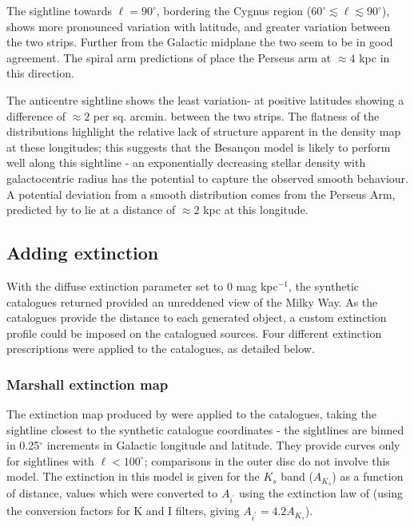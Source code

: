 \documentclass[a4paper,useAMS,usenatbib]{mn2e}
\begin{document}
The sightline towards $\ell=90^{\circ}$, bordering the Cygnus region ($60^{\circ}\lesssim\ell\lesssim 90^{\circ}$), shows more pronounced variation with latitude, and greater variation between the two strips. Further from the Galactic midplane the two seem to be in good agreement. The spiral arm predictions of \citet{Vallee2008} place the Perseus arm at $\approx4$ kpc in this direction.

The anticentre sightline shows the least variation- at positive latitudes showing a difference of $\approx 2$ per sq. arcmin. between the two strips. The flatness of the distributions highlight the relative lack of structure apparent in the density map at these longitudes; this suggests that the Besan\c{c}on model is likely to perform well along this sightline - an exponentially decreasing stellar density with galactocentric radius has the potential to capture the observed smooth behaviour. A potential deviation from a smooth distribution comes from the Perseus Arm, predicted by \citet{Vallee2008} to lie at a distance of $\approx2$ kpc at this longitude.

\subsection{Adding extinction}
\label{subsec:adding_extinction}
With the diffuse extinction parameter set to 0 mag kpc$^{-1}$, the synthetic catalogues returned provided an unreddened view of the Milky Way. As the catalogues provide the distance to each generated object, a custom extinction profile could be imposed on the catalogued sources. Four different extinction prescriptions were applied to the catalogues, as detailed below.

\subsubsection{Marshall extinction map}
The extinction map produced by \citet{Marshall2006} were applied to the catalogues, taking the sightline closest to the synthetic catalogue coordinates - the \citet{Marshall2006} sightlines are binned in 0.25$^{\circ}$ increments in Galactic longitude and latitude. They provide curves only for sightlines with $\ell<100^{\circ}$; comparisons in the outer disc do not involve this model. The extinction in this model is given for the $K_s$ band ($A_{K_{s}}$) as a function of distance, values which were converted to $A_{i^{\prime}}$ using the extinction law of \citet{Cardelli1989} (using the conversion factors for K and I filters, giving $A_{i^{\prime}}=4.2A_{K_{s}}$).
\end{document}
